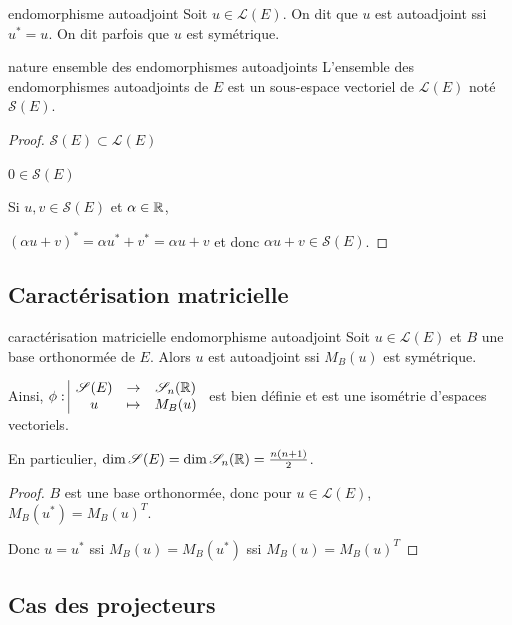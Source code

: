 \begin{definition}{endomorphisme autoadjoint}{}
    Soit $u \in \mathscr L(E)$. On dit que $u$ est autoadjoint ssi $u^* = u$.
    On dit parfois que $u$ est symétrique. 
\end{definition}

\begin{theoreme}{nature ensemble des endomorphismes autoadjoints}{}
    L'ensemble des endomorphismes autoadjoints de $E$ est un sous-espace vectoriel
    de $\mathscr L(E)$ noté $\mathscr S(E)$. 
\end{theoreme}

\begin{proof}
    $\mathscr S(E) \subset \mathscr L(E)$

    $0 \in \mathscr S(E)$ 

    Si $u, v \in \mathscr S(E)$ et $\alpha \in \mathbb{R}$, 

    $(\alpha u + v)^* = \alpha u^* + v^* = \alpha u + v$ et donc $\alpha u + v \in \mathscr S(E)$.
\end{proof}

\subsection{Caractérisation matricielle}

\begin{proposition}{caractérisation matricielle endomorphisme autoadjoint}{}
    Soit $u \in \mathscr L(E)$ et $B$ une base orthonormée de $E$. 
    Alors $u$ est autoadjoint ssi $M_B(u)$ est 
    symétrique. 
    
    Ainsi, $\phi: \space \begin{array}{|ccc} \displaystyle \mathscr S(E) & \to & \displaystyle \mathscr S_n(\mathbb{R}) \\ \displaystyle u & \mapsto & \displaystyle M_B(u) \end{array}$ 
    est bien définie et est une isométrie d'espaces vectoriels. 

    En particulier, $\dim \mathscr S(E) = \dim \mathscr S_n(\mathbb{R}) = \frac{n(n + 1)}{2}$.
\end{proposition}

\begin{proof}
    $B$ est une base orthonormée, donc pour $u \in \mathscr L(E)$, 
    $M_B(u^*) = M_B(u)^T$.

    Donc $u = u^*$ ssi $M_B(u) = M_B(u^*)$ ssi $M_B(u) = M_B(u)^T$ 
\end{proof}

\subsection{Cas des projecteurs }

